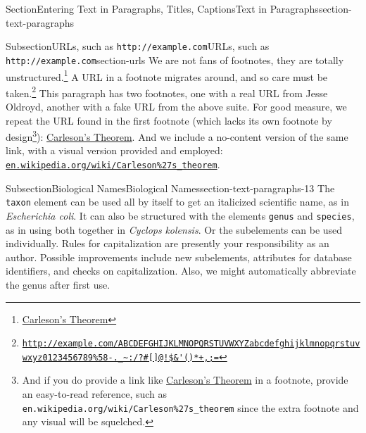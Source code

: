 \documentclass[twoside,10pt,]{article}
\newcommand{\mono}[1]{\texttt{#1}}
\numberwithin{equation}{section}
\begin{document}
\begin{sectionptx}{Section}{Entering Text in Paragraphs, Titles, Captions}{}{Text in Paragraphs}{}{}{section-text-paragraphs}
\begin{subsectionptx}{Subsection}{URLs, such as \mono{http://example.com}}{}{URLs, such as \mono{http://example.com}}{}{}{section-urls}
We are not fans of footnotes, they are totally unstructured.\footnote{\href{https://en.wikipedia.org/wiki/Carleson\%27s_theorem}{Carleson's Theorem}\label{section-urls-10-1}} A URL in a footnote migrates around, and so care must be taken.\footnote{\href{http://example.com/ABCDEFGHIJKLMNOPQRSTUVWXYZabcdefghijklmnopqrstuvwxyz0123456789\%58-._\~:/?\#[]@!$\&'()*+,;=}{\nolinkurl{http://example.com/ABCDEFGHIJKLMNOPQRSTUVWXYZabcdefghijklmnopqrstuvwxyz0123456789\%58-._\~:/?\#[]@!$\&'()*+,;=}}\label{section-urls-10-2}} This paragraph has two footnotes, one with a real URL from Jesse Oldroyd, another with a fake URL from the above suite. For good measure, we repeat the URL found in the first footnote (which lacks its own footnote by design\footnote{And if you do provide a link like \href{https://en.wikipedia.org/wiki/Carleson\%27s_theorem}{Carleson's Theorem} in a footnote, provide an easy-to-read reference, such as \mono{en.wikipedia.org/wiki/Carleson\%27s\_theorem} since the extra footnote and any visual will be squelched.\label{section-urls-10-3}}): \href{https://en.wikipedia.org/wiki/Carleson\%27s_theorem}{Carleson's Theorem}. And we include a no-content version of the same link, with a visual version provided and employed: \href{https://en.wikipedia.org/wiki/Carleson\%27s_theorem}{\nolinkurl{en.wikipedia.org/wiki/Carleson\%27s_theorem}}.%
\end{subsectionptx}
%
%
\typeout{************************************************}
\typeout{************************************************}
%
\begin{subsectionptx}{Subsection}{Biological Names}{}{Biological Names}{}{}{section-text-paragraphs-13}
%
%
%
The \mono{taxon} element can be used all by itself to get an italicized scientific name, as in \textit{Escherichia coli}.  It can also be structured with the elements \mono{genus} and \mono{species}, as in using both together in \textit{Cyclops} \textit{kolensis}.  Or the subelements can be used individually.  Rules for capitalization are presently your responsibility as an author.  Possible improvements include new subelements, attributes for database identifiers, and checks on capitalization.  Also, we might automatically abbreviate the genus after first use.%
\par

\end{subsectionptx}
\end{sectionptx}
\end{document}
